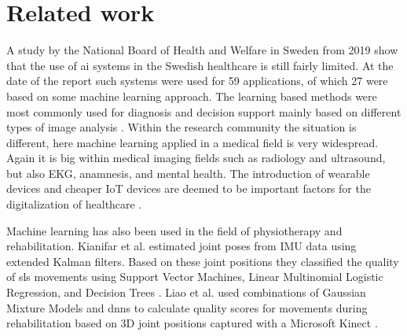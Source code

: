 

\section{Related work}
A study by the National Board of Health and Welfare in Sweden from 2019 show that the use of \gls{ai} systems in the Swedish healthcare is still fairly limited. At the date of the report such systems were used for 59 applications, of which 27 were based on some machine learning approach. The learning based methods were most commonly used for diagnosis and decision support mainly based on different types of image analysis \cite{soc2019}. Within the research community the situation is different, here machine learning applied in a medical field is very widespread. Again it is big within medical imaging fields such as radiology and ultrasound, but also EKG, anamnesis, and mental health. The introduction of wearable devices and cheaper IoT devices are deemed to be important factors for the digitalization of healthcare \cite{Topol2019}.

Machine learning has also been used in the field of physiotherapy and rehabilitation. Kianifar et al. estimated joint poses from IMU data using extended Kalman filters. Based on these joint positions they classified the quality of \gls{sls} movements using Support Vector Machines, Linear Multinomial Logistic Regression, and Decision Trees \cite{Kianifar2016}. Liao et al. used combinations of Gaussian Mixture Models and \glspl{dnn} to calculate quality scores for movements during rehabilitation based on 3D joint positions captured with a Microsoft Kinect \cite{Liao2020}.


